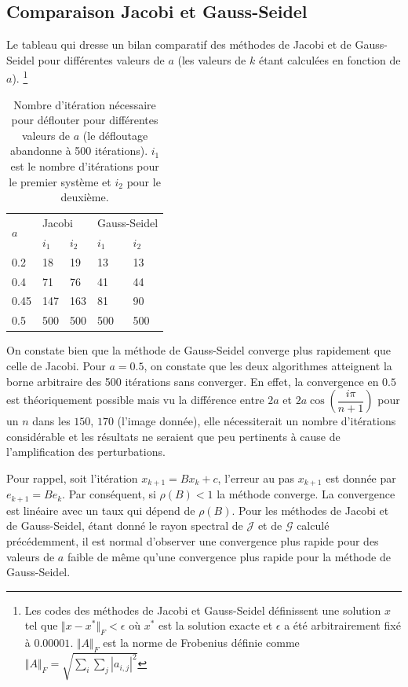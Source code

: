\subsection{Comparaison Jacobi et Gauss-Seidel}
Le tableau qui dresse un bilan comparatif des méthodes de Jacobi et de Gauss-Seidel pour différentes valeurs de $a$ (les valeurs de $k$ étant calculées en fonction de $a$).
\footnote{Les codes des méthodes de Jacobi et Gauss-Seidel définissent une solution $x$
tel que $\Vert x-x^* \Vert_F < \epsilon$ où $x^*$ est la solution exacte et $\epsilon$ a été arbitrairement fixé à $0.00001$. $\Vert A \Vert_F$ est la norme de Frobenius définie comme $\Vert A \Vert_F = \sqrt{\sum_i \sum_j |a_{i,j}|^2}$}
\begin{table}
  \centering
  \begin{tabular}{|l|l|l|l|l|}
    \hline
    \multirow{2}{*}{$a$} & \multicolumn{2}{l|}{Jacobi} & \multicolumn{2}{l|}{Gauss-Seidel}\\
    \cline{2-5}
        & $i_1$ & $i_2$ & $i_1$ & $i_2$\\
    \hline
    0.2 & 18    & 19    & 13    & 13\\
    \hline
    0.4 & 71    & 76    & 41    & 44\\
    \hline
    0.45& 147   & 163   & 81    & 90\\
    \hline
    0.5 & 500   & 500   & 500   & 500\\
    \hline
  \end{tabular}
  \caption{Nombre d'itération nécessaire pour déflouter pour différentes valeurs de $a$ (le défloutage abandonne à 500 itérations).
  $i_1$ est le nombre d'itérations pour le premier système et $i_2$ pour le deuxième.}
  \label{tab:iter}
\end{table}
On constate bien que la méthode de Gauss-Seidel converge plus rapidement que celle de Jacobi. Pour $a=0.5$, on constate que les deux algorithmes atteignent la borne arbitraire des 500 itérations sans converger. En effet, la convergence en $0.5$ est théoriquement possible mais vu la différence entre $2a$ et $2a \cos(\dfrac{i \pi}{n+1})$ pour un $n$ dans les $150$, $170$ (l'image donnée), elle nécessiterait un nombre d'itérations considérable et les résultats ne seraient que peu pertinents à cause de l'amplification des perturbations. %

Pour rappel, soit l'itération $x_{k+1} = B x_k + c$,
l'erreur au pas $x_{k+1}$ est donnée par $e_{k+1} = B e_k $. Par conséquent, si $\rho (B)<1$ la méthode converge. La convergence est linéaire avec un taux qui dépend de $\rho(B)$. Pour les méthodes de Jacobi et de Gauss-Seidel, étant donné le rayon spectral de $\mathcal{J}$ et de $\mathcal{G}$ calculé précédemment, il est normal d'observer une convergence plus rapide pour des valeurs de $a$ faible de même qu'une convergence plus rapide pour la méthode de Gauss-Seidel. 



